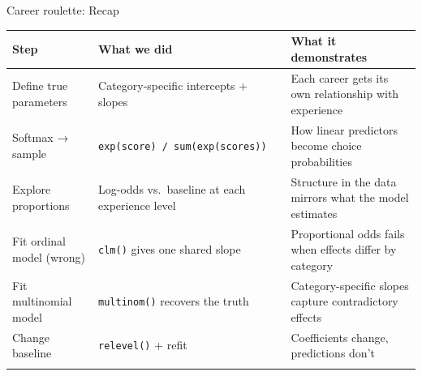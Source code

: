 \documentclass[
  ignorenonframetext,
]{beamer}
\begin{document}
\begin{frame}[fragile]{Career roulette: Recap}
\label{career-roulette-recap}
\begin{longtable}[]{@{}
  >{\raggedright\arraybackslash}p{}
  >{\raggedright\arraybackslash}p{}
  >{\raggedright\arraybackslash}p{}@{}}
\toprule\noalign{}
\begin{minipage}[b]{\linewidth}\raggedright
Step
\end{minipage} & \begin{minipage}[b]{\linewidth}\raggedright
What we did
\end{minipage} & \begin{minipage}[b]{\linewidth}\raggedright
What it demonstrates
\end{minipage} \\
\midrule\noalign{}
\endhead
Define true parameters & Category-specific intercepts + slopes & Each
career gets its own relationship with experience \\
Softmax → sample & \texttt{exp(score)\ /\ sum(exp(scores))} & How linear
predictors become choice probabilities \\
Explore proportions & Log-odds vs.~baseline at each experience level &
Structure in the data mirrors what the model estimates \\
Fit ordinal model (wrong) & \texttt{clm()} gives one shared slope &
Proportional odds fails when effects differ by category \\
Fit multinomial model & \texttt{multinom()} recovers the truth &
Category-specific slopes capture contradictory effects \\
Change baseline & \texttt{relevel()} + refit & Coefficients change,
predictions don't \\
\bottomrule\noalign{}
\end{longtable}


\pause

\begin{tcolorbox}[enhanced jigsaw, colback=white, coltitle=black, titlerule=0mm, rightrule=.15mm, bottomtitle=1mm, leftrule=.75mm, opacitybacktitle=0.6, breakable, title=\textcolor{quarto-callout-note-color}{\faInfo}\hspace{0.5em}{Note}, arc=.35mm, toptitle=1mm, bottomrule=.15mm, colframe=quarto-callout-note-color-frame, colbacktitle=quarto-callout-note-color!10!white, toprule=.15mm, opacityback=0, left=2mm]


\end{tcolorbox}
\end{frame}
\end{document}
